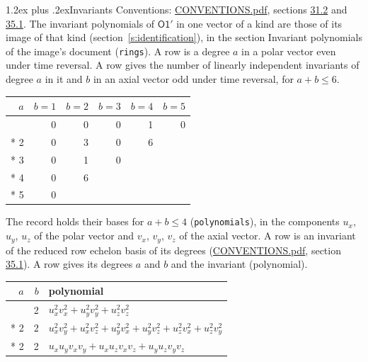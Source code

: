 \documentclass[10pt,a4paper]{article}
\makeatletter
\renewcommand\section{\@startsection{section}{1}{\z@}{-3ex plus -1ex minus -.2ex}%
  {1.2ex plus .2ex}{\normalfont\large\sffamily\bfseries\color{parttitle}}}
\numberwithin{equation}{section}
\newcommand{\grp}[1]{\mathsf{#1}}
\makeatother
\begin{document}
\section{Invariants}\label{s:invariants}
Conventions: \href{../../CONVENTIONS.pdf}{CONVENTIONS.pdf}, sections \href{../../CONVENTIONS.pdf\#conv.31.2}{31.2} and \href{../../CONVENTIONS.pdf\#conv.35.1}{35.1}.
The invariant polynomials of $\grp{O1'}$ in one vector of a kind are those of its image of that kind (section~\ref{s:identification}), in the section Invariant polynomials of the image's document (\texttt{rings}).
\leavevmode\label{n:index.degree.polar}\label{n:index.degree.axial}A row is a degree $a$ in a polar vector even under time reversal. A row gives the number of linearly independent invariants of degree $a$ in it and $b$ in an axial vector odd under time reversal, for $a + b \le 6$.
{\small\begin{longtable}{@{}rrrrrr@{}}\toprule
$a$ & $b = 1$ & $b = 2$ & $b = 3$ & $b = 4$ & $b = 5$\\\midrule\endhead
\bottomrule\endfoot\endlastfoot
1 & 0 & 0 & 0 & 1 & 0\\*
2 & 0 & 3 & 0 & 6 & \\*
3 & 0 & 1 & 0 &  & \\*
4 & 0 & 6 &  &  & \\*
5 & 0 &  &  &  & \\
\bottomrule\end{longtable}}
\leavevmode\label{n:local.component.polar}\label{n:local.component.axial}The record holds their bases for $a + b \le 4$ (\texttt{polynomials}), in the components $u_{x}$, $u_{y}$, $u_{z}$ of the polar vector and $v_{x}$, $v_{y}$, $v_{z}$ of the axial vector. \label{n:head.polynomial}A row is an invariant of the reduced row echelon basis of its degrees (\href{../../CONVENTIONS.pdf}{CONVENTIONS.pdf}, section \href{../../CONVENTIONS.pdf\#conv.35.1}{35.1}). A row gives its degrees $a$ and $b$ and the invariant (polynomial).
{\small\renewcommand{\arraystretch}{1.2}\begin{longtable}{@{}rrl@{}}\toprule
$a$ & $b$ & polynomial\\\midrule\endhead
\bottomrule\endfoot\endlastfoot
2 & 2 & $u_{x}^{2}v_{x}^{2} + u_{y}^{2}v_{y}^{2} + u_{z}^{2}v_{z}^{2}$\\*
2 & 2 & $u_{x}^{2}v_{y}^{2} + u_{x}^{2}v_{z}^{2} + u_{y}^{2}v_{x}^{2} + u_{y}^{2}v_{z}^{2} + u_{z}^{2}v_{x}^{2} + u_{z}^{2}v_{y}^{2}$\\*
2 & 2 & $u_{x}u_{y}v_{x}v_{y} + u_{x}u_{z}v_{x}v_{z} + u_{y}u_{z}v_{y}v_{z}$\\
\bottomrule\end{longtable}}
\end{document}
